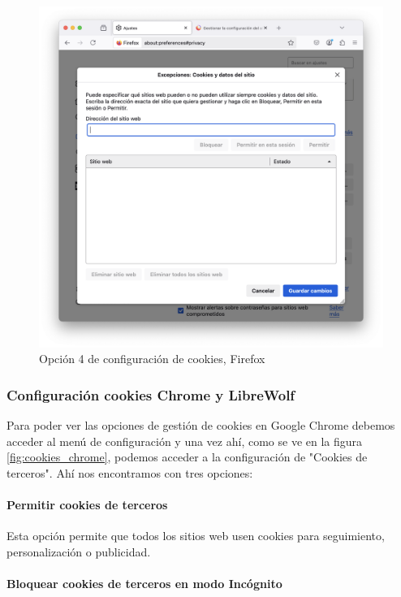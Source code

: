 \begin{figure}[H]   
    \centering
    \includegraphics[width=\textwidth]{opcion4_ej14.png}
    \caption{Opción 4 de configuración de cookies, Firefox}
    \label{fig:opcion4_ej14}
\end{figure}


\subsubsection{Configuración cookies Chrome y LibreWolf}

Para poder ver las opciones de gestión de cookies en Google Chrome debemos acceder al menú de configuración y una vez ahí, como se ve en la figura \ref{fig:cookies_chrome}, podemos acceder a la configuración de "Cookies de terceros". Ahí nos encontramos con tres opciones:

\paragraph{Permitir cookies de terceros}

Esta opción permite que todos los sitios web usen cookies para seguimiento, personalización o publicidad.

\paragraph{Bloquear cookies de terceros en modo Incógnito}

